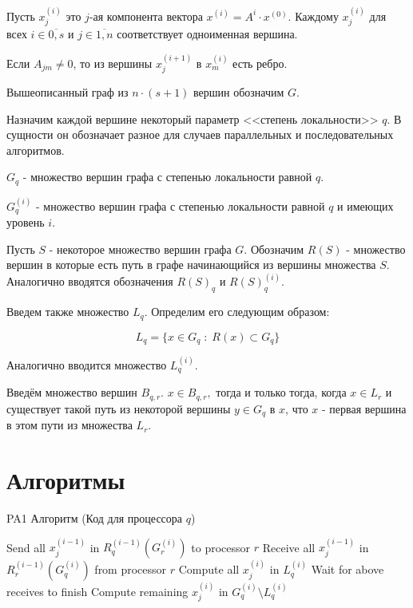 \documentclass[a4paper,12pt]{report}
\begin{document}
    Пусть $x_j^{(i)}$ это $j$-ая компонента вектора $x^{(i)} = A^i \cdot x^{(0)}$. Каждому $x_j^{(i)}$ для всех $i \in \overline{0, s}$ и $j \in \overline{1,n}$ соответствует одноименная вершина.

    Если $A_{jm} \ne 0$, то из вершины $x_j^{(i+1)}$ в $x_m^{(i)}$ есть ребро.

    Вышеописанный граф из $n \cdot (s + 1)$ вершин обозначим $G$.

    Назначим каждой вершине некоторый параметр <<степень локальности>> $q$. В сущности он обозначает разное для случаев параллельных и последовательных алгоритмов.
    
    $G_q$ - множество вершин графа с степенью локальности равной $q$. 

    $G_q^{(i)}$ - множество вершин графа с степенью локальности равной $q$ и имеющих уровень $i$.

    Пусть $S$ - некоторое множество вершин графа $G$. Обозначим $R(S)$ - множество вершин в которые есть путь в графе начинающийся из вершины множества $S$. Аналогично вводятся обозначения $R(S)_q$ и $R(S)_q^{(i)}$.

    Введем также множество $L_q$. Определим его следующим образом:

    $$ L_q = \{ x \in G_q \; : \; R(x) \subset G_q \} $$

    Аналогично вводится множество $L_q^{(i)}$.

    Введём множество вершин $B_{q,r}$. $x \in B_{q,r},$ тогда и только тогда, когда $x \in L_r$ и существует такой путь из некоторой вершины $y \in G_q$ в $x$, что $x$ - первая вершина в этом пути из множества $L_r$.

    \section{ Алгоритмы }

    \begin{algorithm}
    \caption{PA1 Алгоритм (Код для процессора $q$)}
    \label{algo:PA0}
    \begin{algorithmic}[1]
    
            \State Send all $x^{(i-1)}_j$ in $R^{(i-1)}_q(G^{(i)}_r)$ to processor $r$
        \EndFor
            \State Receive all $x^{(i-1)}_j$ in $R^{(i-1)}_r(G^{(i)}_q)$ from processor $r$
        \EndFor
        \State Compute all $x^{(i)}_j$ in $L^{(i)}_q$
        \State Wait for above receives to finish
        \State Compute remaining $x^{(i)}_j$ in $G^{(i)}_q \setminus L^{(i)}_q$
    \EndFor
    
    \end{algorithmic}
    \end{algorithm}
\end{document}
